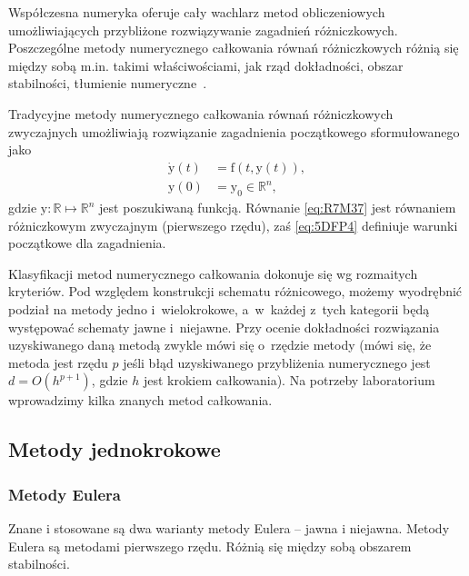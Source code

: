 \documentclass[paper=a4,DIV=12]{lpas}
\newcommand{\brm}[1]{\bm{\mathrm{#1}}}
\begin{document}
\begin{appendices}
Współczesna numeryka oferuje cały wachlarz metod obliczeniowych umożliwiających
przybliżone rozwiązywanie zagadnień różniczkowych. Poszczególne metody
numerycznego całkowania równań różniczkowych różnią się między sobą m.in.
takimi właściwościami, jak rząd dokładności, obszar stabilności, tłumienie
numeryczne~\cite{asher&petzold:1998:computer-methods}.

Tradycyjne metody numerycznego całkowania równań różniczkowych zwyczajnych
umożliwiają rozwiązanie zagadnienia początkowego sformułowanego jako
\begin{subequations}
\label{eq:L8KAD}
\begin{align}
  \dot{\brm{y}}\left(t\right) &= \brm{f}\left(t, \brm{y}(t)\right),
  \label{eq:R7M37}
  \\
  \brm{y}\left(0\right) &= \brm{y}_0 \in \mathbb{R}^n,
  \label{eq:5DFP4}
\end{align}
\end{subequations}
gdzie $\brm{y}: \mathbb{R} \mapsto \mathbb{R}^n$ jest poszukiwaną funkcją.
Równanie \eqref{eq:R7M37} jest równaniem różniczkowym zwyczajnym (pierwszego
rzędu), zaś \eqref{eq:5DFP4} definiuje warunki początkowe dla zagadnienia.

Klasyfikacji metod numerycznego całkowania dokonuje się wg rozmaitych
kryteriów. Pod względem konstrukcji schematu różnicowego, możemy wyodrębnić
podział na metody jedno i~wielokrokowe, a~w~każdej z~tych kategorii będą
występować schematy jawne i~niejawne. Przy ocenie dokładności rozwiązania
uzyskiwanego daną metodą zwykle mówi się o~rzędzie metody (mówi się, że metoda
jest rzędu $p$ jeśli błąd uzyskiwanego przybliżenia numerycznego jest $d =
O(h^{p+1})$, gdzie $h$ jest krokiem całkowania). Na potrzeby laboratorium
wprowadzimy kilka znanych metod całkowania.

\subsection{Metody jednokrokowe}
\label{sec:5BIFZ}

\subsubsection{Metody Eulera}
\label{sec:AN1EA}

Znane i stosowane są dwa warianty metody Eulera -- jawna i niejawna. Metody
Eulera są metodami pierwszego rzędu. Różnią się między sobą obszarem
stabilności.


\end{appendices}
\end{document}
